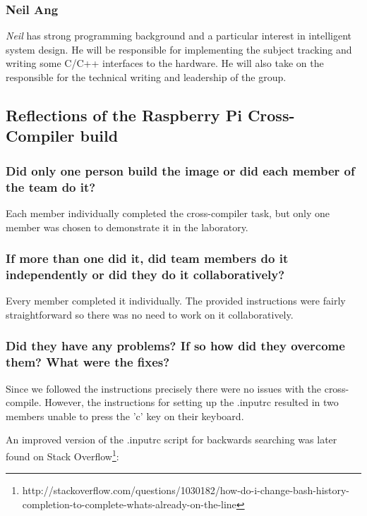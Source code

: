 \documentclass[11pt,a4paper,titlepage]{report}
\begin{document}
\subsection{Neil Ang}
\textit{Neil} has strong programming background and a particular interest in intelligent system design. He will be responsible for implementing the subject tracking and writing some C/C++ interfaces to the hardware. He will also take on the responsible for the technical writing and leadership of the group. 


\begin{appendices}
\chapter{Reflections of the Raspberry Pi Cross-Compiler build}

\subsection*{Did only one person build the image or did each member of the team do it?}

Each member individually completed the cross-compiler task, but only one member was chosen to demonstrate it in the laboratory.

\subsection*{If more than one did it, did team members do it independently or did they do it 
collaboratively?}

Every member completed it individually. The provided instructions were fairly straightforward so there was no need to work on it collaboratively.

\subsection*{Did they have any problems? If so how did they overcome them? What were 
the fixes?}

Since we followed the instructions precisely there were no issues with the cross-compile. However, the instructions for setting up the .inputrc resulted in two members unable to press the 'c' key on their keyboard.

An improved version of the .inputrc script for backwards searching was later found on Stack Overflow\footnote{http://stackoverflow.com/questions/1030182/how-do-i-change-bash-history-completion-to-complete-whats-already-on-the-line}:


\end{appendices}
\end{document}
